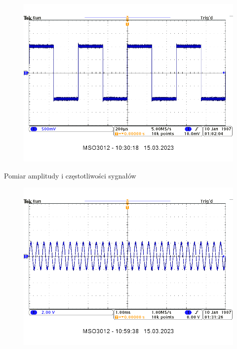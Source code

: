 \documentclass[14pt, table]{extarticle}
\begin{document}
\begin{figure}[H]
\includegraphics[scale=0.7]{A17}
\centering
\end{figure}

Pomiar amplitudy i częstotliwości sygnałów

\begin{figure}[H]
\includegraphics[scale=0.7]{A11}
\centering
\end{figure}
\end{document}
